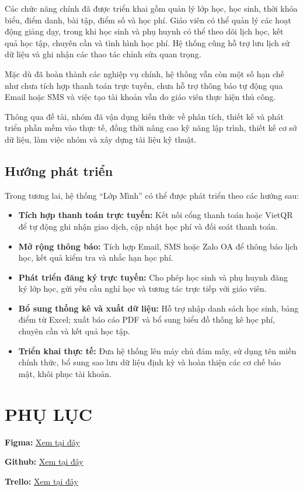 \documentclass[12pt,a4paper]{report}
\begin{document}
Các chức năng chính đã được triển khai gồm quản lý lớp học, học sinh, thời khóa biểu, điểm danh, bài tập, điểm số và học phí. Giáo viên có thể quản lý các hoạt động giảng dạy, trong khi học sinh và phụ huynh có thể theo dõi lịch học, kết quả học tập, chuyên cần và tình hình học phí. Hệ thống cũng hỗ trợ lưu lịch sử dữ liệu và ghi nhận các thao tác chỉnh sửa quan trọng.

Mặc dù đã hoàn thành các nghiệp vụ chính, hệ thống vẫn còn một số hạn chế như chưa tích hợp thanh toán trực tuyến, chưa hỗ trợ thông báo tự động qua Email hoặc SMS và việc tạo tài khoản vẫn do giáo viên thực hiện thủ công.

Thông qua đề tài, nhóm đã vận dụng kiến thức về phân tích, thiết kế và phát triển phần mềm vào thực tế, đồng thời nâng cao kỹ năng lập trình, thiết kế cơ sở dữ liệu, làm việc nhóm và xây dựng tài liệu kỹ thuật.

\section*{Hướng phát triển}

Trong tương lai, hệ thống ``Lớp Mình'' có thể được phát triển theo các hướng sau:

\begin{itemize}

    \item \textbf{Tích hợp thanh toán trực tuyến:} Kết nối cổng thanh toán hoặc VietQR để tự động ghi nhận giao dịch, cập nhật học phí và đối soát thanh toán.

    \item \textbf{Mở rộng thông báo:} Tích hợp Email, SMS hoặc Zalo OA để thông báo lịch học, kết quả kiểm tra và nhắc hạn học phí.

    \item \textbf{Phát triển đăng ký trực tuyến:} Cho phép học sinh và phụ huynh đăng ký lớp học, gửi yêu cầu nghỉ học và tương tác trực tiếp với giáo viên.

    \item \textbf{Bổ sung thống kê và xuất dữ liệu:} Hỗ trợ nhập danh sách học sinh, bảng điểm từ Excel; xuất báo cáo PDF và bổ sung biểu đồ thống kê học phí, chuyên cần và kết quả học tập.

    \item \textbf{Triển khai thực tế:} Đưa hệ thống lên máy chủ đám mây, sử dụng tên miền chính thức, bổ sung sao lưu dữ liệu định kỳ và hoàn thiện các cơ chế bảo mật, khôi phục tài khoản.
\end{itemize}

\chapter*{PHỤ LỤC}
\textbf{Figma:} \href{https://www.figma.com/design/tunDzTI0HpgDmwxYDPEyts/Project_CNPM?node-id=0-1&t=GiMNttk1ZiMvnf2k-1}{Xem tại đây} 

\textbf{Github:} \href{https://github.com/thichnguyettinh/Project_CNPM}{Xem tại đây}

\textbf{Trello:} \href{https://trello.com/invite/b/6ab68912ea8e2c4dd88e9eb0/ATTI980c5c5c2e919fad7a98eb6f60daba03E6D689CA/projectcnpm}{Xem tại đây}
\end{document}
